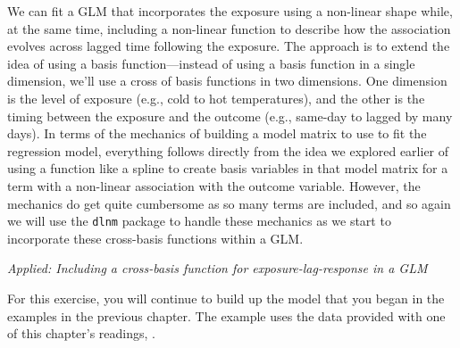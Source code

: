 \documentclass[
]{book}
\begin{document}
We can fit a GLM that incorporates the exposure using a non-linear shape while, at the
same time, including a non-linear function to describe how the association evolves
across lagged time following the exposure. The approach is to extend the idea of
using a basis function---instead of using a basis function in a single dimension, we'll
use a cross of basis functions in two dimensions. One dimension is the level of exposure
(e.g., cold to hot temperatures), and the other is the timing between the exposure and
the outcome (e.g., same-day to lagged by many days). In terms of the mechanics of
building a model matrix to use to fit the regression model, everything follows directly
from the idea we explored earlier of using a function like a spline to create basis
variables in that model matrix for a term with a non-linear association with the
outcome variable. However, the mechanics do get quite cumbersome as so many terms are
included, and so again we will use the \texttt{dlnm} package to handle these mechanics as we
start to incorporate these cross-basis functions within a GLM.

\emph{Applied: Including a cross-basis function for exposure-lag-response in a GLM}

For this exercise, you will continue to build up the model that you began in
the examples in the previous chapter. The example uses the data provided with
one of this chapter's readings, \citet{vicedo2019hands}.
\end{document}
